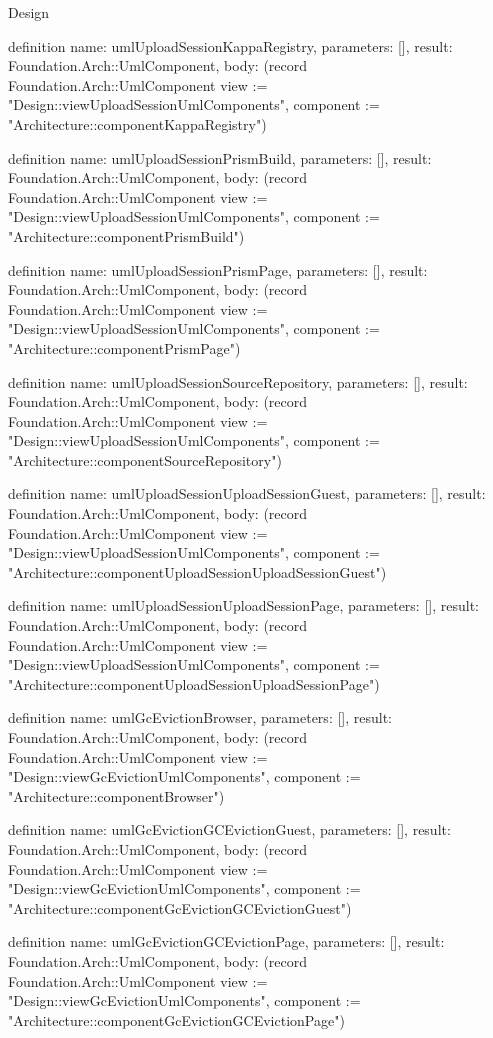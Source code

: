 \begin{lexlean}{Design}
\begin{semanticmodule}
definition{
  name: umlUploadSessionKappaRegistry,
  parameters: [],
  result: Foundation.Arch::UmlComponent,
  body: (record Foundation.Arch::UmlComponent {view := "Design::viewUploadSessionUmlComponents", component := "Architecture::componentKappaRegistry"})
}

definition{
  name: umlUploadSessionPrismBuild,
  parameters: [],
  result: Foundation.Arch::UmlComponent,
  body: (record Foundation.Arch::UmlComponent {view := "Design::viewUploadSessionUmlComponents", component := "Architecture::componentPrismBuild"})
}

definition{
  name: umlUploadSessionPrismPage,
  parameters: [],
  result: Foundation.Arch::UmlComponent,
  body: (record Foundation.Arch::UmlComponent {view := "Design::viewUploadSessionUmlComponents", component := "Architecture::componentPrismPage"})
}

definition{
  name: umlUploadSessionSourceRepository,
  parameters: [],
  result: Foundation.Arch::UmlComponent,
  body: (record Foundation.Arch::UmlComponent {view := "Design::viewUploadSessionUmlComponents", component := "Architecture::componentSourceRepository"})
}

definition{
  name: umlUploadSessionUploadSessionGuest,
  parameters: [],
  result: Foundation.Arch::UmlComponent,
  body: (record Foundation.Arch::UmlComponent {view := "Design::viewUploadSessionUmlComponents", component := "Architecture::componentUploadSessionUploadSessionGuest"})
}

definition{
  name: umlUploadSessionUploadSessionPage,
  parameters: [],
  result: Foundation.Arch::UmlComponent,
  body: (record Foundation.Arch::UmlComponent {view := "Design::viewUploadSessionUmlComponents", component := "Architecture::componentUploadSessionUploadSessionPage"})
}

definition{
  name: umlGcEvictionBrowser,
  parameters: [],
  result: Foundation.Arch::UmlComponent,
  body: (record Foundation.Arch::UmlComponent {view := "Design::viewGcEvictionUmlComponents", component := "Architecture::componentBrowser"})
}

definition{
  name: umlGcEvictionGCEvictionGuest,
  parameters: [],
  result: Foundation.Arch::UmlComponent,
  body: (record Foundation.Arch::UmlComponent {view := "Design::viewGcEvictionUmlComponents", component := "Architecture::componentGcEvictionGCEvictionGuest"})
}

definition{
  name: umlGcEvictionGCEvictionPage,
  parameters: [],
  result: Foundation.Arch::UmlComponent,
  body: (record Foundation.Arch::UmlComponent {view := "Design::viewGcEvictionUmlComponents", component := "Architecture::componentGcEvictionGCEvictionPage"})
}


\end{semanticmodule}
\end{lexlean}
